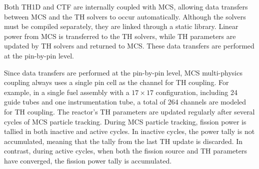 Both TH1D and CTF are internally coupled with MCS, allowing data transfers between MCS and the TH solvers to occur automatically. Although the solvers must be compiled separately, they are linked through a static library. Linear power from MCS is transferred to the TH solvers, while TH parameters are updated by TH solvers and returned to MCS. These data transfers are performed at the pin-by-pin level.

Since data transfers are performed at the pin-by-pin level, MCS multi-physics coupling always uses a single pin cell as the channel for TH coupling. For example, in a single fuel assembly with a $17\times17$ configuration, including 24 guide tubes and one instrumentation tube, a total of 264 channels are modeled for TH coupling. The reactor's TH parameters are updated regularly after several cycles of MCS particle tracking. During MCS particle tracking, fission power is tallied in both inactive and active cycles. In inactive cycles, the power tally is not accumulated, meaning that the tally from the last TH update is discarded. In contrast, during active cycles, when both the fission source and TH parameters have converged, the fission power tally is accumulated.

